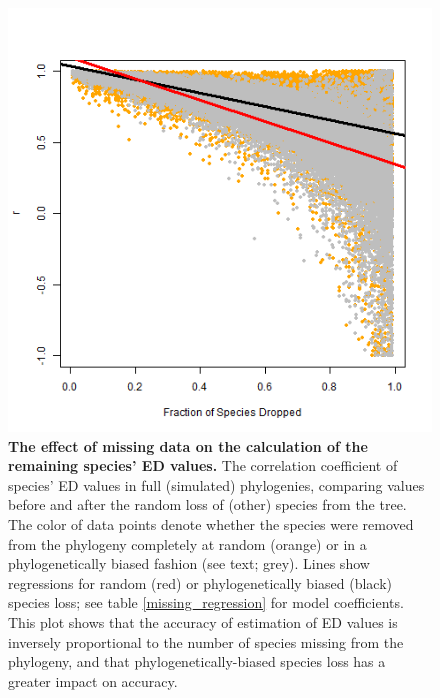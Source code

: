 \documentclass[10pt,english]{article}
\begin{document}
\begin{figure}[!ht]
  \center
  \includegraphics[width=.5\textwidth]{randomVsCluster.png}
  \caption{\textbf{The effect of missing data on the calculation of the
      remaining species' ED values.} The correlation coefficient of species' ED
      values in full (simulated) phylogenies, comparing values before and after
      the random loss of (other) species from the tree. The color of data points
      denote whether the species were removed from the phylogeny completely at
      random (orange) or in a phylogenetically biased fashion (see text; grey).
      Lines show regressions for random (red) or phylogenetically biased (black)
      species loss; see table \ref{missing_regression} for model coefficients.
      This plot shows that the accuracy of estimation of ED values is inversely
      proportional to the number of species missing from the phylogeny, and that
      phylogenetically-biased species loss has a greater impact on accuracy.}
  \label{randomVsClustered}
\end{figure}
\end{document}
